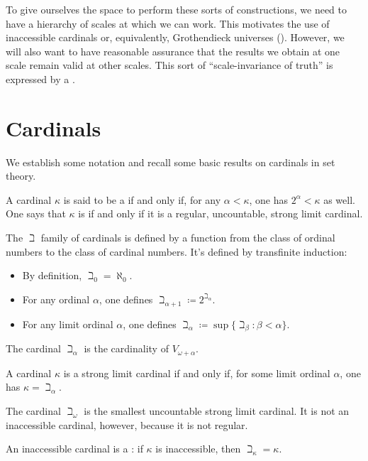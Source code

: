 To give ourselves the space to perform these sorts of constructions, we need to have a hierarchy of scales at which we can work.
This motivates the use of inaccessible cardinals or, equivalently, Grothendieck universes ().
However, we will also want to have reasonable assurance that the results we obtain at one scale remain valid at other scales.
This sort of \enquote{scale-invariance of truth} is expressed by a .

\section{Cardinals}%
\label{sec:cardinals}

We establish some notation and recall some basic results on cardinals in set theory.

\begin{definition}
	A cardinal $\kappa$ is said to be a  if and only if, for any $\alpha<\kappa$, one has $2^\alpha<\kappa$ as well.
	One says that $\kappa$ is  if and only if it is a regular, uncountable, strong limit cardinal.
\end{definition}

\begin{eg}
	The $\beth$ family of cardinals is defined by a function from the class of ordinal numbers to the class of cardinal numbers.
	It's defined by transfinite induction:
	\begin{itemize}
		\item By definition, $ \beth_0 = \aleph_0 $.
		\item For any ordinal $ \alpha $, one defines $ \beth_{\alpha+1} \coloneq 2^{\beth_{\alpha}} $.
		\item For any limit ordinal $ \alpha $, one defines $ \beth_{\alpha} \coloneq \sup \{ \beth_{\beta} : \beta < \alpha \} $.
	\end{itemize}
	The cardinal $ \beth_{\alpha} $ is the cardinality of $ V_{\omega+\alpha} $.

	A cardinal $ \kappa $ is a strong limit cardinal if and only if, for some limit ordinal $ \alpha $, one has $ \kappa = \beth_{\alpha} $.

	The cardinal $ \beth_{\omega} $ is the smallest uncountable strong limit cardinal.
	It is not an inaccessible cardinal, however, because it is not regular.

	An inaccessible cardinal is a :
	if $ \kappa $ is inaccessible, then $ \beth_{\kappa} = \kappa $.
\end{eg}

